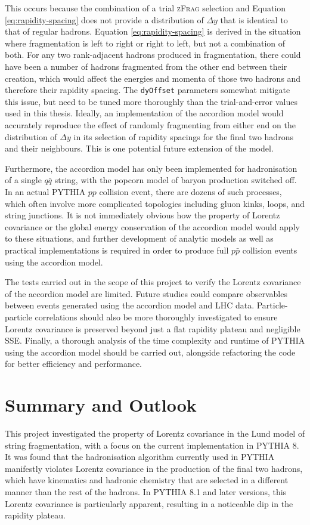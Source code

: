 \documentclass[12pt,a4paper]{report}
\begin{document}
This occurs because the combination of a trial \textsc{zFrag} selection and Equation \eqref{eq:rapidity-spacing} does not provide a distribution of $\Delta y$ that is identical to that of regular hadrons. Equation \eqref{eq:rapidity-spacing} is derived in the situation where fragmentation is left to right or right to left, but not a combination of both. For any two rank-adjacent hadrons produced in fragmentation, there could have been a number of hadrons fragmented from the other end between their creation, which would affect the energies and momenta of those two hadrons and therefore their rapidity spacing. The \texttt{dyOffset} parameters somewhat mitigate this issue, but need to be tuned more thoroughly than the trial-and-error values used in this thesis. Ideally, an implementation of the accordion model would accurately reproduce the effect of randomly fragmenting from either end on the distribution of $\Delta y$ in its selection of rapidity spacings for the final two hadrons and their neighbours. This is one potential future extension of the model.

Furthermore, the accordion model has only been implemented for hadronisation of a single $q\bar{q}$ string, with the popcorn model of baryon production switched off. In an actual PYTHIA $pp$ collision event, there are dozens of such processes, which often involve more complicated topologies including gluon kinks, loops, and string junctions. It is not immediately obvious how the property of Lorentz covariance or the global energy conservation of the accordion model would apply to these situations, and further development of analytic models as well as practical implementations is required in order to produce full $p\bar{p}$ collision events using the accordion model.

The tests carried out in the scope of this project to verify the Lorentz covariance of the accordion model are limited. Future studies could compare observables between events generated using the accordion model and LHC data. Particle-particle correlations should also be more thoroughly investigated to ensure Lorentz covariance is preserved beyond just a flat rapidity plateau and negligible SSE. Finally, a thorough analysis of the time complexity and runtime of PYTHIA using the accordion model should be carried out, alongside refactoring the code for better efficiency and performance.

\chapter{Summary and Outlook}
This project investigated the property of Lorentz covariance in the Lund model of string fragmentation, with a focus on the current implementation in PYTHIA 8. It was found that the hadronisation algorithm currently used in PYTHIA manifestly violates Lorentz covariance in the production of the final two hadrons, which have kinematics and hadronic chemistry that are selected in a different manner than the rest of the hadrons. In PYTHIA 8.1 and later versions, this Lorentz covariance is particularly apparent, resulting in a noticeable dip in the rapidity plateau.
\end{document}
